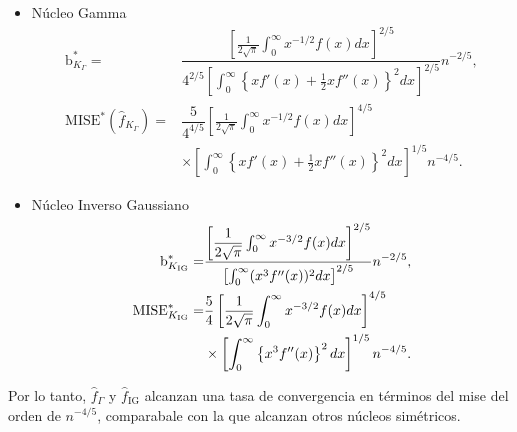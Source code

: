 \begin{itemize}
	\item Núcleo Gamma
	\begin{align}
	\label{MISEoptGamma}
	\text{b}^*_{K_\Gamma}=&\dfrac{\left[\frac{1}{2\sqrt{\pi}} \int_{0}^{\infty} x^{-1/2}f(x)dx \right]^{2/5}}
	{4^{2/5} \left[\int_{0}^{\infty}  \left\{x f'(x) +\frac{1}{2} x f''(x)\right\}^2 dx \right]^{2/5}} n^{-2/5},\\
	\nonumber \text{MISE}^*(\widehat{f}_{K_\Gamma})=&\dfrac{5}{4^{4/5}} \left[\frac{1}{2\sqrt{\pi}} \int_{0}^{\infty} x^{-1/2}f(x)dx \right]^{4/5} \\
	&\times \left[\int_{0}^{\infty}  \left\{x f'(x) +\frac{1}{2} x f''(x)\right\}^2 dx \right]^{1/5} n^{-4/5}. 
	\end{align}
	\item Núcleo Inverso Gaussiano
	\begin{align}
	\label{MISEoptIG}
	\text{b}^*_{K_{\tiny \text{IG}}}=&\dfrac{\left[\dfrac{1}{2\sqrt{\pi}} \int_{0}^{\infty} x^{-3/2}f(x)dx \right]^{2/5}}
	{ \left[\int_{0}^{\infty}(x^3 f''(x))^2 dx \right]^{2/5}} n^{-2/5},\\
	\nonumber \text{MISE}^*_{K_{\tiny \text{IG}}}=&\dfrac{5}{4} \left[\frac{1}{2\sqrt{\pi}} \int_{0}^{\infty} x^{-3/2}f(x)dx \right]^{4/5} \\
	&\times \left[\int_{0}^{\infty}  \left\{x^3 f''(x) \right\}^2 dx \right]^{1/5} n^{-4/5} .
	\end{align}
\end{itemize}

Por lo tanto, $\widehat{f}_{\Gamma}$  y $\widehat{f}_{\text{IG}}$ alcanzan una tasa de convergencia en términos del mise del orden de $n^{-4/5}$, comparabale con la que alcanzan otros núcleos simétricos.


